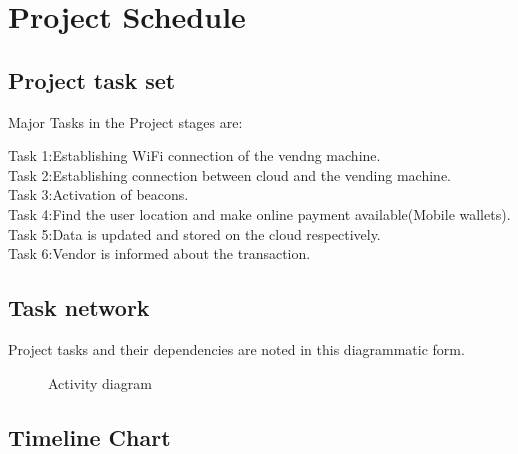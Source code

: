 \documentclass[oneside,a4paper,12pt]{report}
\begin{document}
\section{Project Schedule}  
\subsection{Project task set}  
Major Tasks in the Project stages are:

Task 1:Establishing WiFi connection of the vendng machine.\\
Task 2:Establishing connection between cloud and the vending machine.\\
Task 3:Activation of beacons.\\
Task 4:Find the user location and make online payment available(Mobile wallets). \\
Task 5:Data is updated and stored on the cloud respectively.\\
Task 6:Vendor is informed about the transaction.\\

\subsection{Task network}  
Project tasks and their dependencies are noted in this diagrammatic form.
\begin{center}
	\begin{figure}[!htbp]
		\centering
	  \caption{Activity diagram}
	  \label{fig:act-dig}
	\end{figure}
\end{center}  

\subsection{Timeline Chart}  
\end{document}
